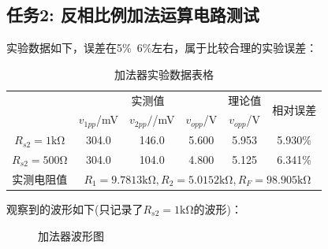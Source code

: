 \documentclass[a4paper,11pt,UTF8]{article}
\begin{document}
\subsection{任务2: 反相比例加法运算电路测试}
实验数据如下，误差在5\%~6\%左右，属于比较合理的实验误差：
\begin{table}[htbp]
	\centering
	\caption*{加法器实验数据表格}
	\begin{tabular}{|c|c|c|c|c|c|}
		\hline
		\multirow{2}{*}{}   & \multicolumn{3}{c|}{实测值} & 理论值 &
		\multirow{2}{*}{相对误差}\\
		\cline{2-5}
		\multirow{2}{*}{} & $v_{1pp}$/mV & $v_{2pp}/$/mV & $v_{opp}$/V & $v_{opp}$/V & \multirow{2}{*}{}\\
		\hline
		$R_{s2}=1\mathrm{k\Omega}$ & 304.0 & 146.0 & 5.600 & 5.953 & 5.930\% \\
		\hline
		$R_{s2}=500\mathrm{\Omega}$ & 304.0 & 104.0 & 4.800 & 5.125 & 6.341\% \\
		\hline
		实测电阻值 & \multicolumn{5}{c|}{$R_1=9.7813\mathrm{k\Omega},R_2=5.0152\mathrm{k\Omega}, R_F=98.905\mathrm{k\Omega}$}\\
		\hline
	\end{tabular}
\end{table}

观察到的波形如下(只记录了$R_{s2}=1\mathrm{k\Omega}$的波形)：
\begin{figure}[H]
	\centering
	\setcounter{subfigure}{0}
	\caption*{加法器波形图}
\end{figure}
\end{document}
